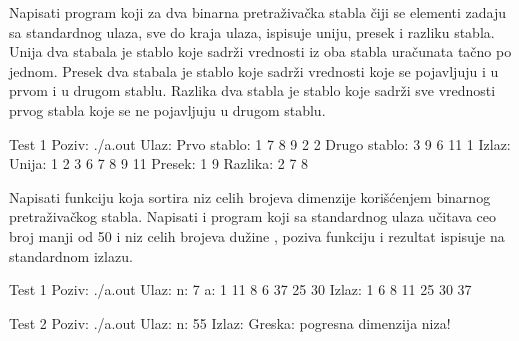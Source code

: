\begin{Answer}[ref=707]
\end{Answer}


\begin{Exercise}[label=708, difficulty=1]
Napisati program koji za dva binarna pretraživačka stabla čiji se elementi zadaju sa standardnog ulaza, sve do kraja ulaza, ispisuje uniju, presek i razliku stabla. Unija dva stabala je stablo koje sadrži vrednosti iz oba stabla uračunata tačno po jednom. Presek dva stabala je stablo koje sadrži vrednosti koje se pojavljuju i u prvom i u drugom stablu. Razlika dva stabla je stablo koje sadrži sve vrednosti prvog stabla koje se ne pojavljuju u drugom stablu. 

\begin{miditest}
\begin{test}{Test 1}
Poziv: ./a.out
Ulaz:
	Prvo stablo: 1 7 8 9 2 2
	Drugo stablo: 3 9 6 11 1
Izlaz:
	Unija: 1 2 3 6 7 8 9 11
	Presek: 1 9 
	Razlika: 2 7 8 
\end{test}
\end{miditest}


\end{Exercise}

\begin{Answer}[ref=708]
\end{Answer}


\begin{Exercise}[label=709]
Napisati funkciju  koja sortira niz celih brojeva  dimenzije  korišćenjem binarnog pretraživačkog stabla. Napisati i program koji sa standardnog ulaza učitava ceo broj  manji od 50 i niz  celih brojeva dužine , poziva funkciju  i rezultat ispisuje na standardnom izlazu.  

\begin{miditest}
\begin{test}{Test 1}
Poziv: ./a.out
Ulaz:
	n: 7 
	a: 1 11 8 6 37 25 30
Izlaz:
	1 6 8 11 25 30 37 
\end{test}
\end{miditest}

\begin{maxitest}
\begin{test}{Test 2}
Poziv: ./a.out
Ulaz:
	n: 55 
Izlaz:
	Greska: pogresna dimenzija niza!
\end{test}
\end{maxitest}


\end{Exercise}

